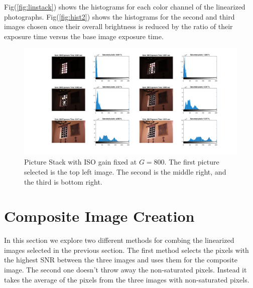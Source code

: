 \documentclass[a4paper]{article}
\begin{document}
Fig(\ref{fig:linstack}) shows the  histograms for each color channel of the linearized photographs.  Fig(\ref{fig:hist2}) shows the histograms for the second and third images chosen once their overall brightness is reduced by the ratio of their exposure time versus the base image exposure time. 

\begin{figure}[H]
\centering
\includegraphics[trim=7cm 1cm 1cm 0cm clip, scale=.4]{Chapel_Histogram_set.png}
\caption{Picture Stack with ISO gain fixed at $G = 800$.  The first picture selected is the top left image.  The second is the middle right, and the third is bottom right.}
\label{fig:stack}
\end{figure}
\FloatBarrier
\section{Composite Image Creation}
In this section we explore two different methods for combing the linearized images selected in the previous section. The first method selects the pixels with the highest SNR between the three images and uses them for the composite image.  The second one doesn't throw away the non-saturated pixels.  Instead it takes the average of the pixels from the three images with non-saturated pixels. 
\end{document}

